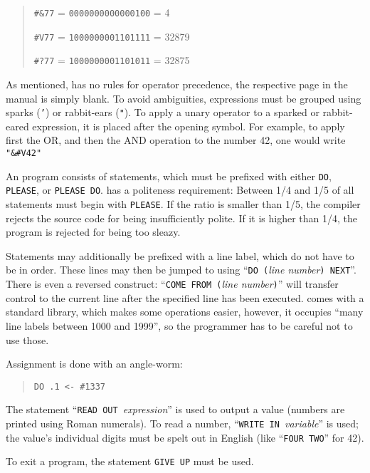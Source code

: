 \begin{quotation}
\texttt{\#\&77} = \texttt{0000000000000100} = 4

\nopagebreak

\texttt{\#V77} = \texttt{1000000001101111} = 32879

\nopagebreak

\texttt{\#?77} = \texttt{1000000001101011} = 32875
\end{quotation}

As mentioned, \ic{} has no rules for operator precedence, the respective page in the manual is simply blank. To avoid ambiguities, expressions must be grouped using sparks (\texttt{'}) or rabbit-ears (\texttt{"}). To apply a unary operator to a sparked or rabbit-eared expression, it is placed after the opening symbol. For example, to apply first the OR, and then the AND operation to the number 42, one would write \texttt{"\&\#V42"}

An \ic{} program consists of statements, which must be prefixed with either \texttt{DO}, \texttt{PLEASE}, or \texttt{PLEASE DO}. \ic{} has a politeness requirement: Between 1/4 and 1/5 of all statements must begin with \texttt{PLEASE}. If the ratio is smaller than 1/5, the compiler rejects the source code for being insufficiently polite. If it is higher than 1/4, the program is rejected for being too sleazy.

Statements may additionally be prefixed with a line label, which do not have to be in order. These lines may then be jumped to using “\texttt{DO (}\emph{line number}\texttt{) NEXT}”. There is even a reversed construct: “\texttt{COME FROM (}\emph{line number}\texttt{)}” will transfer control to the current line after the specified line has been executed. \ic{} comes with a standard library, which makes some operations easier, however, it occupies “many line labels between 1000 and 1999”, so the programmer has to be careful not to use those.

Assignment is done with an angle-worm:

\begin{quotation}
    \texttt{DO .1 <- \#1337}
\end{quotation}

The statement “\texttt{READ OUT }\emph{expression}” is used to output a value (numbers are printed using Roman numerals). To read a number, “\texttt{WRITE IN }\emph{variable}” is used; the value's individual digits must be spelt out in English (like “\texttt{FOUR TWO}” for 42).

To exit a program, the statement \texttt{GIVE UP} must be used.

